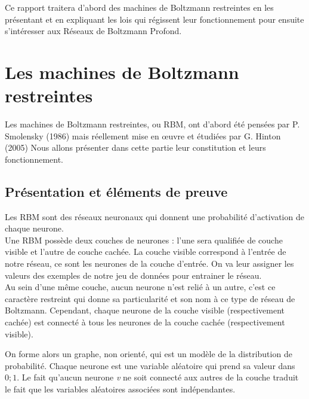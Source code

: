 \documentclass[a4paper,oneside]{report}
\begin{document}
            Ce rapport traitera d'abord des machines de Boltzmann restreintes en les
            présentant et en expliquant les lois qui régissent leur fonctionnement pour
            ensuite s'intéresser aux Réseaux de Boltzmann Profond.

        \chapter{Les machines de Boltzmann restreintes}

            Les machines de Boltzmann restreintes, ou RBM, ont d'abord été
            pensées par P. Smolensky (1986) mais réellement mise en œuvre et
            étudiées par G.
            Hinton (2005) Nous allons présenter dans cette partie leur constitution et
            leurs fonctionnement.

            \section{Présentation et éléments de preuve}

                Les RBM sont des réseaux neuronaux qui donnent une
                probabilité d'activation de chaque neurone.\\

                Une RBM possède deux couches de neurones : l'une sera qualifiée 
                de couche visible et l'autre de couche cachée.
                La couche visible correspond à l'entrée de notre réseau, ce sont
                les neurones de la couche d'entrée. On va leur assigner les
                valeurs des exemples de notre jeu de données pour entrainer le
                réseau.\\

                Au sein d'une même couche, aucun neurone n'est relié à un
                autre, c'est ce caractère restreint qui donne sa particularité 
                et son nom à ce type de réseau de Boltzmann.
                Cependant, chaque neurone de la couche visible (respectivement
                cachée) est connecté à tous les neurones de la couche cachée 
                (respectivement visible). 
                
                On forme alors un graphe, non orienté, qui est un
                modèle de la distribution de probabilité. Chaque neurone est une variable aléatoire
                qui prend sa valeur dans \begin{math}{0;1}\end{math}. Le fait
                qu'aucun neurone \textit{v} ne soit connecté aux autres de la
                couche traduit le fait que les variables aléatoires associées
                sont indépendantes.
                
\end{document}
